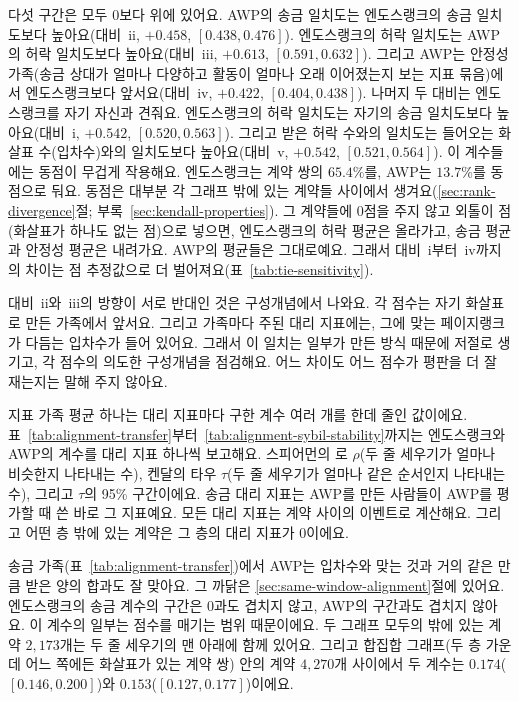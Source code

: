 다섯 구간은 모두 0보다 위에 있어요. AWP의 송금 일치도는 엔도스랭크의 송금 일치도보다 높아요(대비~ii, $+0.458$, $[0.438,0.476]$). 엔도스랭크의 허락 일치도는 AWP의 허락 일치도보다 높아요(대비~iii, $+0.613$, $[0.591,0.632]$). 그리고 AWP는 안정성 가족(송금 상대가 얼마나 다양하고 활동이 얼마나 오래 이어졌는지 보는 지표 묶음)에서 엔도스랭크보다 앞서요(대비~iv, $+0.422$, $[0.404,0.438]$). 나머지 두 대비는 엔도스랭크를 자기 자신과 견줘요. 엔도스랭크의 허락 일치도는 자기의 송금 일치도보다 높아요(대비~i, $+0.542$, $[0.520,0.563]$). 그리고 받은 허락 수와의 일치도는 들어오는 화살표 수(입차수)와의 일치도보다 높아요(대비~v, $+0.542$, $[0.521,0.564]$). 이 계수들에는 동점이 무겁게 작용해요. 엔도스랭크는 계약 쌍의 $65.4\%$를, AWP는 $13.7\%$를 동점으로 둬요. 동점은 대부분 각 그래프 밖에 있는 계약들 사이에서 생겨요(\ref{sec:rank-divergence}절; 부록~\ref{sec:kendall-properties}). 그 계약들에 0점을 주지 않고 외톨이 점(화살표가 하나도 없는 점)으로 넣으면, 엔도스랭크의 허락 평균은 올라가고, 송금 평균과 안정성 평균은 내려가요. AWP의 평균들은 그대로예요. 그래서 대비~i부터~iv까지의 차이는 점 추정값으로 더 벌어져요(표~\ref{tab:tie-sensitivity}).

대비~ii와~iii의 방향이 서로 반대인 것은 구성개념에서 나와요. 각 점수는 자기 화살표로 만든 가족에서 앞서요. 그리고 가족마다 주된 대리 지표에는, 그에 맞는 페이지랭크가 다듬는 입차수가 들어 있어요. 그래서 이 일치는 일부가 만든 방식 때문에 저절로 생기고, 각 점수의 의도한 구성개념을 점검해요. 어느 차이도 어느 점수가 평판을 더 잘 재는지는 말해 주지 않아요.


지표 가족 평균 하나는 대리 지표마다 구한 계수 여러 개를 한데 줄인 값이에요. 표~\ref{tab:alignment-transfer}부터~\ref{tab:alignment-sybil-stability}까지는 엔도스랭크와 AWP의 계수를 대리 지표 하나씩 보고해요. 스피어먼의 로 $\rho$(두 줄 세우기가 얼마나 비슷한지 나타내는 수), 켄달의 타우 $\tau$(두 줄 세우기가 얼마나 같은 순서인지 나타내는 수), 그리고 $\tau$의 95\% 구간이에요. 송금 대리 지표는 AWP를 만든 사람들이 AWP를 평가할 때 쓴 바로 그 지표예요\parencite{do2023awp}. 모든 대리 지표는 계약 사이의 이벤트로 계산해요. 그리고 어떤 층 밖에 있는 계약은 그 층의 대리 지표가 0이에요.



송금 가족(표~\ref{tab:alignment-transfer})\label{sub:transfer-family}에서 AWP는 입차수와 맞는 것과 거의 같은 만큼 받은 양의 합과도 잘 맞아요. 그 까닭은 \ref{sec:same-window-alignment}절에 있어요. 엔도스랭크의 송금 계수의 구간은 0과도 겹치지 않고, AWP의 구간과도 겹치지 않아요. 이 계수의 일부는 점수를 매기는 범위 때문이에요. 두 그래프 모두의 밖에 있는 계약 $2{,}173$개는 두 줄 세우기의 맨 아래에 함께 있어요. 그리고 합집합 그래프(두 층 가운데 어느 쪽에든 화살표가 있는 계약 쌍) 안의 계약 $4{,}270$개 사이에서 두 계수는 $0.174$($[0.146,0.200]$)와 $0.153$($[0.127,0.177]$)이에요.

